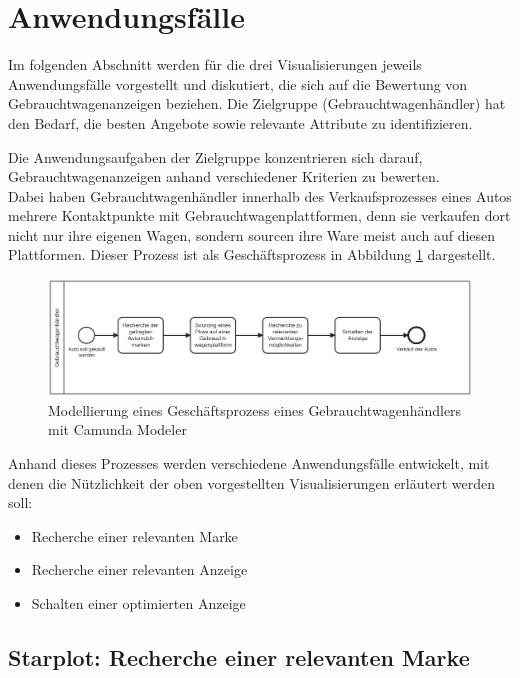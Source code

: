 \section{Anwendungsfälle}


Im folgenden Abschnitt werden für die drei Visualisierungen jeweils Anwendungsfälle vorgestellt und diskutiert, die sich auf die Bewertung von Gebrauchtwagenanzeigen beziehen. Die Zielgruppe (Gebrauchtwagenhändler) hat den Bedarf, die besten Angebote sowie relevante Attribute zu identifizieren.

Die Anwendungsaufgaben der Zielgruppe konzentrieren sich darauf, Gebrauchtwagenanzeigen anhand verschiedener Kriterien zu bewerten. \\
Dabei haben Gebrauchtwagenhändler innerhalb des Verkaufsprozesses eines Autos mehrere Kontaktpunkte mit Gebrauchtwagenplattformen, denn sie verkaufen dort nicht nur ihre eigenen Wagen, sondern sourcen ihre Ware meist auch auf diesen Plattformen. Dieser Prozess ist als Geschäftsprozess in Abbildung \ref{fig:business-process} dargestellt. \\

\begin{figure}[H]
    \centering
    \includegraphics[width=\textwidth]{img/verkaufsprozess.png}
    \caption{Modellierung eines Geschäftsprozess eines Gebrauchtwagenhändlers mit Camunda Modeler}
    \label{fig:business-process}
\end{figure}
Anhand dieses Prozesses werden verschiedene Anwendungsfälle entwickelt, mit denen die Nützlichkeit der oben vorgestellten Visualisierungen erläutert werden soll: \\
\begin{itemize}
    \item Recherche einer relevanten Marke
    \item Recherche einer relevanten Anzeige
    \item Schalten einer optimierten Anzeige
\end{itemize}
\subsection{Starplot: Recherche einer relevanten Marke }

